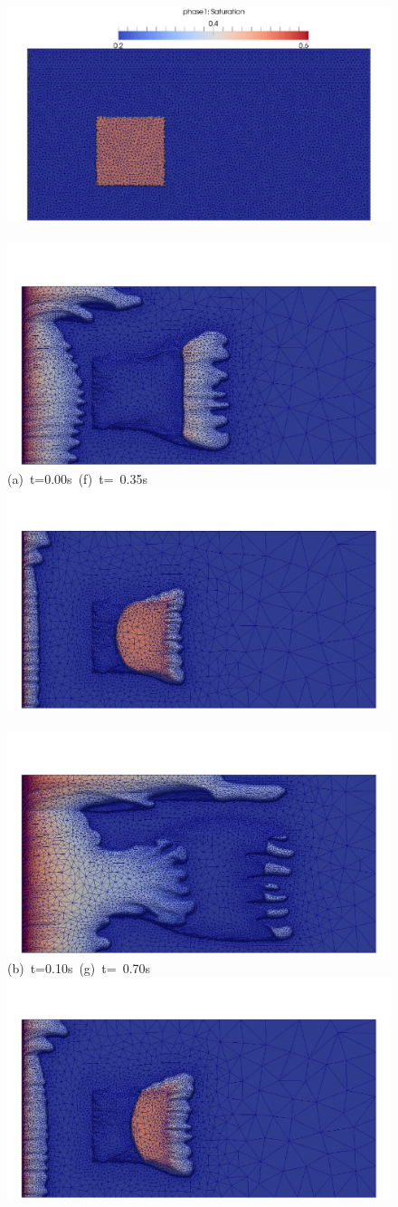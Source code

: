   \begin{figure}[ht]
  \vbox{\vspace{-2.cm}
      \hbox{\includegraphics[width=.45\textwidth]{./Pics1/Section4_4/5r_po_left_inlet_adapt_D0b.pdf} 
            \includegraphics[width=.45\textwidth]{./Pics1/Section4_4/5r_po_left_inlet_adapt_D350b.pdf}}
      \vspace{-.1cm}\hbox{\hspace{2.cm}(a) t=0.00s \hspace{4cm} (f) t= 0.35s}\vspace{-.1cm}
      \hbox{\includegraphics[width=.45\textwidth]{./Pics1/Section4_4/5r_po_left_inlet_adapt_D100b.pdf} 
            \includegraphics[width=.45\textwidth]{./Pics1/Section4_4/5r_po_left_inlet_adapt_D700b.pdf}}
      \vspace{-.1cm}\hbox{\hspace{2.cm}(b) t=0.10s \hspace{4cm} (g) t= 0.70s}\vspace{-.1cm}
      \hbox{\includegraphics[width=.45\textwidth]{./Pics1/Section4_4/5r_po_left_inlet_adapt_D150b.pdf} 
}}
\end{figure}
